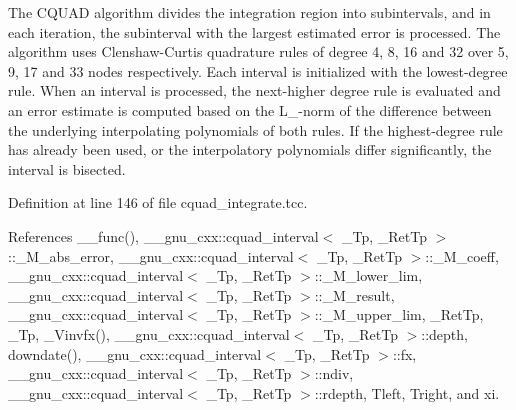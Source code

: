 The C\+Q\+U\+AD algorithm divides the integration region into subintervals, and in each iteration, the subinterval with the largest estimated error is processed. The algorithm uses Clenshaw-\/\+Curtis quadrature rules of degree 4, 8, 16 and 32 over 5, 9, 17 and 33 nodes respectively. Each interval is initialized with the lowest-\/degree rule. When an interval is processed, the next-\/higher degree rule is evaluated and an error estimate is computed based on the L\+\_-\/norm of the difference between the underlying interpolating polynomials of both rules. If the highest-\/degree rule has already been used, or the interpolatory polynomials differ significantly, the interval is bisected. 

Definition at line 146 of file cquad\+\_\+integrate.\+tcc.



References \+\_\+\+\_\+func(), \+\_\+\+\_\+gnu\+\_\+cxx\+::cquad\+\_\+interval$<$ \+\_\+\+Tp, \+\_\+\+Ret\+Tp $>$\+::\+\_\+\+M\+\_\+abs\+\_\+error, \+\_\+\+\_\+gnu\+\_\+cxx\+::cquad\+\_\+interval$<$ \+\_\+\+Tp, \+\_\+\+Ret\+Tp $>$\+::\+\_\+\+M\+\_\+coeff, \+\_\+\+\_\+gnu\+\_\+cxx\+::cquad\+\_\+interval$<$ \+\_\+\+Tp, \+\_\+\+Ret\+Tp $>$\+::\+\_\+\+M\+\_\+lower\+\_\+lim, \+\_\+\+\_\+gnu\+\_\+cxx\+::cquad\+\_\+interval$<$ \+\_\+\+Tp, \+\_\+\+Ret\+Tp $>$\+::\+\_\+\+M\+\_\+result, \+\_\+\+\_\+gnu\+\_\+cxx\+::cquad\+\_\+interval$<$ \+\_\+\+Tp, \+\_\+\+Ret\+Tp $>$\+::\+\_\+\+M\+\_\+upper\+\_\+lim, \+\_\+\+Ret\+Tp, \+\_\+\+Tp, \+\_\+\+Vinvfx(), \+\_\+\+\_\+gnu\+\_\+cxx\+::cquad\+\_\+interval$<$ \+\_\+\+Tp, \+\_\+\+Ret\+Tp $>$\+::depth, downdate(), \+\_\+\+\_\+gnu\+\_\+cxx\+::cquad\+\_\+interval$<$ \+\_\+\+Tp, \+\_\+\+Ret\+Tp $>$\+::fx, \+\_\+\+\_\+gnu\+\_\+cxx\+::cquad\+\_\+interval$<$ \+\_\+\+Tp, \+\_\+\+Ret\+Tp $>$\+::ndiv, \+\_\+\+\_\+gnu\+\_\+cxx\+::cquad\+\_\+interval$<$ \+\_\+\+Tp, \+\_\+\+Ret\+Tp $>$\+::rdepth, Tleft, Tright, and xi.


